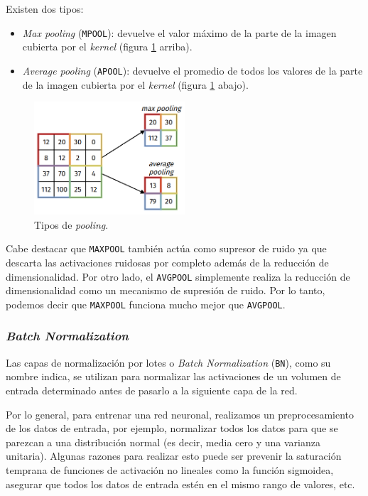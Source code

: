 \documentclass[a4paper,12pt]{article}
\begin{document}
Existen dos tipos:
\begin{itemize}[noitemsep, topsep=2pt]
	\item \textit{Max pooling} (\texttt{MPOOL}): devuelve el valor máximo de la parte de la imagen cubierta por el \textit{kernel} (figura \ref{fig:type-pooling} arriba).
	\item \textit{Average pooling} (\texttt{APOOL}): devuelve el promedio de todos los valores de la parte de la imagen cubierta por el \textit{kernel} (figura \ref{fig:type-pooling} abajo).
\end{itemize}

\begin{figure}[H]
	\begin{center}				
		\includegraphics[width=0.5\textwidth]{tesis_45.png}
		\caption{Tipos de \textit{pooling}.}
		\label{fig:type-pooling}
	\end{center}
\end{figure}

Cabe destacar que \texttt{MAXPOOL} también actúa como supresor de ruido ya que descarta las activaciones ruidosas por completo además de la reducción de dimensionalidad. Por otro lado, el \texttt{AVGPOOL} simplemente realiza la reducción de dimensionalidad como un mecanismo de supresión de ruido. Por lo tanto, podemos decir que \texttt{MAXPOOL} funciona mucho mejor que \texttt{AVGPOOL}.

\subsubsection{\textit{Batch Normalization}}

Las capas de normalización por lotes o \textit{Batch Normalization} (\texttt{BN}), como su nombre indica, se utilizan para normalizar las activaciones de un volumen de entrada determinado antes de pasarlo a la siguiente capa de la red.

Por lo general, para entrenar una red neuronal, realizamos un preprocesamiento de los datos de entrada, por ejemplo, normalizar todos los datos para que se parezcan a una distribución normal (es decir, media cero y una varianza unitaria). Algunas razones para realizar esto puede ser prevenir la saturación temprana de funciones de activación no lineales como la función sigmoidea, asegurar que todos los datos de entrada estén en el mismo rango de valores, etc. \citep{bn}
\end{document}
